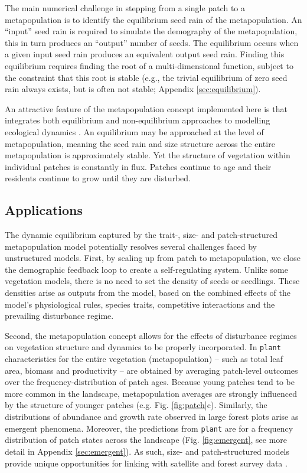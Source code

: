 \documentclass[a4paper,11pt]{article}
\newcommand{\plant}{\texttt{plant}}
\begin{document}
The main numerical challenge in stepping from a single patch to a
metapopulation is to identify the equilibrium seed rain of the
metapopulation. An ``input'' seed rain is required to simulate the
demography of the metapopulation, this in turn produces an ``output''
number of seeds. The equilibrium occurs when a given input seed rain
produces an equivalent output seed rain. Finding this equilibrium
requires finding the root of a multi-dimensional function, subject to
the constraint that this root is stable (e.g., the trivial equilibrium
of zero seed rain always exists, but is often not stable; Appendix
\ref{sec:equilibrium}).

An attractive feature of the metapopulation concept implemented here
is that integrates both equilibrium and non-equilibrium approaches to
modelling ecological dynamics \citep{Kohyama-1993, Moorcroft-2001,
  Falster-2011}. An equilibrium may be approached at the level of
metapopulation, meaning the seed rain and size structure across the
entire metapopulation is approximately stable. Yet the structure of
vegetation within individual patches is constantly in flux. Patches
continue to age and their residents continue to grow until they are
disturbed.

\subsection{Applications}


The dynamic equilibrium captured by the trait-, size- and
patch-structured metapopulation model potentially resolves several
challenges faced by unstructured models. First, by scaling up from
patch to metapopulation, we close the demographic feedback loop to
create a self-regulating system. Unlike some vegetation models, there
is no need to set the density of seeds or seedlings.  These densities
arise as outputs from the model, based on the combined effects of the
model's physiological rules, species traits, competitive interactions
and the prevailing disturbance regime.

Second, the metapopulation concept allows for the effects of disturbance
regimes on vegetation structure and dynamics to be properly incorporated. In
{\plant} characteristics for the entire vegetation (metapopulation) -- such
as total leaf area, biomass and productivity -- are obtained by averaging
patch-level outcomes over the frequency-distribution of patch ages. Because
young patches tend to be more common in the landscape, metapopulation averages are
strongly influenced by the structure of younger patches (e.g. 
Fig. \ref{fig:patch}c).  Similarly, the distributions of  abundance and growth rate
observed in large forest  plots \citep[e.g.][]{Muller-2006, Coomes-2007} arise
as  emergent phenomena. Moreover, the predictions from {\plant} 
are for a frequency distribution of patch states across the landscape 
(Fig. \ref{fig:emergent}, see more detail in Appendix \ref{sec:emergent}). As such,
size- and patch-structured models provide unique opportunities for linking with 
satellite and forest survey data \citep{Moorcroft-2001, Purves-2008}.  
\end{document}
